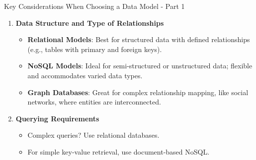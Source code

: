 \documentclass[aspectratio=169]{beamer}
\begin{document}
\begin{frame}[fragile]{Key Considerations When Choosing a Data Model - Part 1}
    \begin{enumerate}
        \item \textbf{Data Structure and Type of Relationships}
            \begin{itemize}
                \item \textbf{Relational Models}: Best for structured data with defined relationships (e.g., tables with primary and foreign keys).
                \item \textbf{NoSQL Models}: Ideal for semi-structured or unstructured data; flexible and accommodates varied data types.
                \item \textbf{Graph Databases}: Great for complex relationship mapping, like social networks, where entities are interconnected.
            \end{itemize}
        \item \textbf{Querying Requirements}
            \begin{itemize}
                \item Complex queries? Use relational databases. 
                \item For simple key-value retrieval, use document-based NoSQL.
            \end{itemize}
    \end{enumerate}
\end{frame}
\end{document}
